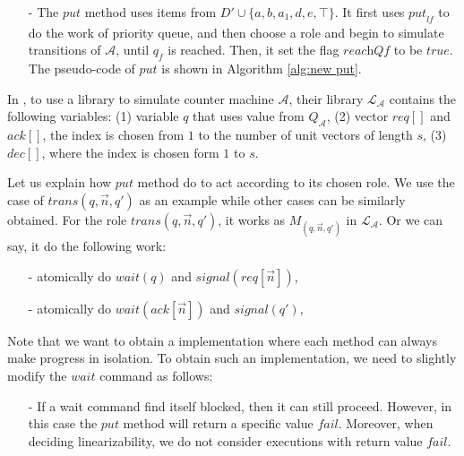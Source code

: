 \begin{itemize}
\setlength{\itemsep}{0.5pt}
\item[-] The $\textit{put}$ method uses items from $D' \cup \{ a,b,a_1,d,e,\top \}$. It first uses $\textit{put}_{\textit{lf}}$ to do the work of priority queue, and then choose a role and begin to simulate transitions of $\mathcal{A}$, until $q_f$ is reached. Then, it set the flag $\textit{reachQf}$ to be $\textit{true}$. The pseudo-code of $\textit{put}$ is shown in Algorithm \ref{alg:new put}.
\end{itemize}

In \cite{conf/esop/BouajjaniEEH13}, to use a library to simulate counter machine $\mathcal{A}$, their library $\mathcal{L}_{\mathcal{A}}$ contains the following variables: (1) variable $q$ that uses value from $Q_{\mathcal{A}}$, (2) vector $\textit{req}[]$ and $\textit{ack}[]$, the index is chosen from $1$ to the number of unit vectors of length $s$, (3) $\textit{dec}[]$, where the index is chosen form $1$ to $s$.

Let us explain how $\textit{put}$ method do to act according to its chosen role. We use the case of $\textit{trans}(q,\vec n,q')$ as an example while other cases can be similarly obtained. For the role $\textit{trans}(q,\vec n,q')$, it works as $M_{(q,\vec n,q')}$ in $\mathcal{L}_{\mathcal{A}}$. Or we can say, it do the following work:

\begin{itemize}
\setlength{\itemsep}{0.5pt}
\item[-] atomically do $\textit{wait}(q)$ and $\textit{signal}(\textit{req}[\vec n])$,
\item[-] atomically do $\textit{wait}(\textit{ack}[\vec n])$ and $\textit{signal}(q')$,
\end{itemize}

Note that we want to obtain a implementation where each method can always make progress in isolation. To obtain such an implementation, we need to slightly modify the $\textit{wait}$ command as follows:

\begin{itemize}
\setlength{\itemsep}{0.5pt}
\item[-] If a wait command find itself blocked, then it can still proceed. However, in this case the $\textit{put}$ method will return a specific value $\textit{fail}$. Moreover, when deciding linearizability, we do not consider executions with return value $\textit{fail}$.
\end{itemize}

